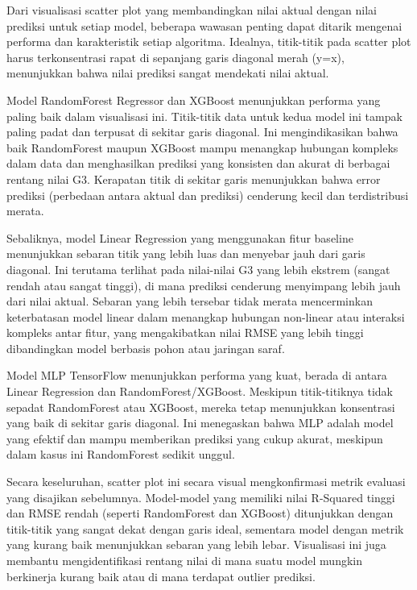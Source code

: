Dari visualisasi scatter plot yang membandingkan nilai aktual dengan nilai prediksi untuk setiap model, beberapa wawasan penting dapat ditarik 
mengenai performa dan karakteristik setiap algoritma. Idealnya, titik-titik pada scatter plot harus terkonsentrasi rapat di sepanjang garis 
diagonal merah (y=x), menunjukkan bahwa nilai prediksi sangat mendekati nilai aktual.

Model RandomForest Regressor dan XGBoost menunjukkan performa yang paling baik dalam visualisasi ini. Titik-titik data untuk kedua model ini 
tampak paling padat dan terpusat di sekitar garis diagonal. Ini mengindikasikan bahwa baik RandomForest maupun XGBoost mampu menangkap hubungan 
kompleks dalam data dan menghasilkan prediksi yang konsisten dan akurat di berbagai rentang nilai G3. Kerapatan titik di sekitar garis menunjukkan bahwa error prediksi (perbedaan antara aktual dan prediksi) cenderung kecil dan terdistribusi merata.

Sebaliknya, model Linear Regression yang menggunakan fitur baseline menunjukkan sebaran titik yang lebih luas dan menyebar jauh dari garis 
diagonal. Ini terutama terlihat pada nilai-nilai G3 yang lebih ekstrem (sangat rendah atau sangat tinggi), di mana prediksi cenderung 
menyimpang lebih jauh dari nilai aktual. Sebaran yang lebih tersebar tidak merata mencerminkan keterbatasan model linear dalam menangkap 
hubungan non-linear atau interaksi kompleks antar fitur, yang mengakibatkan nilai RMSE yang lebih tinggi dibandingkan model berbasis pohon 
atau jaringan saraf.

Model MLP TensorFlow menunjukkan performa yang kuat, berada di antara Linear Regression dan RandomForest/XGBoost. Meskipun titik-titiknya tidak 
sepadat RandomForest atau XGBoost, mereka tetap menunjukkan konsentrasi yang baik di sekitar garis diagonal. Ini menegaskan bahwa MLP adalah 
model yang efektif dan mampu memberikan prediksi yang cukup akurat, meskipun dalam kasus ini RandomForest sedikit unggul.

Secara keseluruhan, scatter plot ini secara visual mengkonfirmasi metrik evaluasi yang disajikan sebelumnya. Model-model yang memiliki nilai 
R-Squared tinggi dan RMSE rendah (seperti RandomForest dan XGBoost) ditunjukkan dengan titik-titik yang sangat dekat dengan garis ideal, 
sementara model dengan metrik yang kurang baik menunjukkan sebaran yang lebih lebar. Visualisasi ini juga membantu mengidentifikasi rentang 
nilai di mana suatu model mungkin berkinerja kurang baik atau di mana terdapat outlier prediksi.



